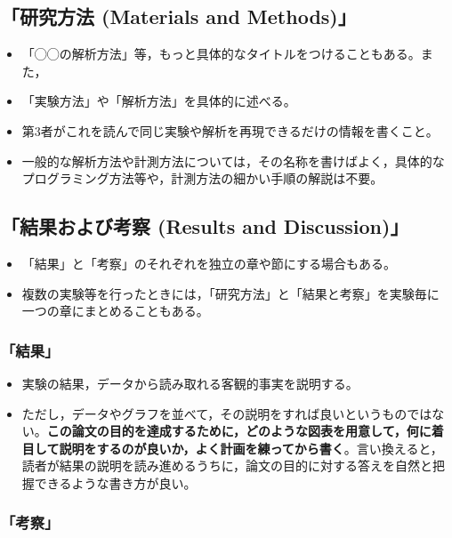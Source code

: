 \documentclass[12pt, ]{jsarticle}
\providecommand{\tightlist}{%
   \setlength{\itemsep}{0pt}\setlength{\parskip}{0pt}}
\begin{document}
\subsection{「研究方法 (Materials and
Methods)」}\label{ux7814ux7a76ux65b9ux6cd5-materials-and-methods}

\begin{itemize}
\tightlist
\item
  「◯◯の解析方法」等，もっと具体的なタイトルをつけることもある。また，
\item
  「実験方法」や「解析方法」を具体的に述べる。
\item
  第3者がこれを読んで同じ実験や解析を再現できるだけの情報を書くこと。
\item
  一般的な解析方法や計測方法については，その名称を書けばよく，具体的なプログラミング方法等や，計測方法の細かい手順の解説は不要。
\end{itemize}

\subsection{「結果および考察 (Results and
Discussion)」}\label{ux7d50ux679cux304aux3088ux3073ux8003ux5bdf-results-and-discussion}

\begin{itemize}
\tightlist
\item
  「結果」と「考察」のそれぞれを独立の章や節にする場合もある。
\item
  複数の実験等を行ったときには，「研究方法」と「結果と考察」を実験毎に一つの章にまとめることもある。
\end{itemize}

\subsubsection{「結果」}\label{ux7d50ux679c}

\begin{itemize}
\tightlist
\item
  実験の結果，データから読み取れる客観的事実を説明する。
\item
  ただし，データやグラフを並べて，その説明をすれば良いというものではない。\textbf{この論文の目的を達成するために，どのような図表を用意して，何に着目して説明をするのが良いか，よく計画を練ってから書く}。言い換えると，読者が結果の説明を読み進めるうちに，論文の目的に対する答えを自然と把握できるような書き方が良い。
\end{itemize}

\subsubsection{「考察」}\label{ux8003ux5bdf}
\end{document}
